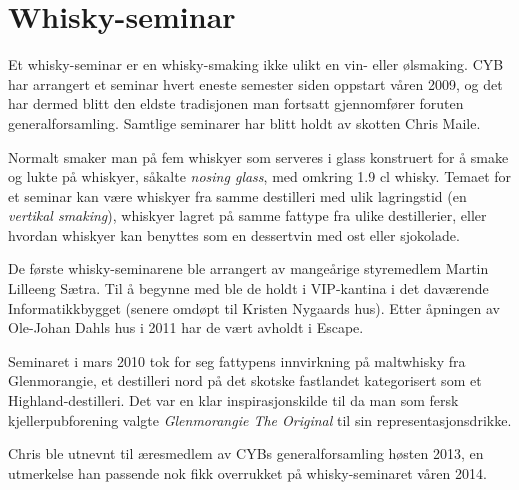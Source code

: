 \chapter{Whisky-seminar}

\author{Skrevet av Torgeir Lebesbye}

Et whisky-seminar er en whisky-smaking ikke ulikt en vin- eller ølsmaking. CYB har arrangert et seminar hvert eneste semester siden oppstart våren 2009, og det har dermed blitt den eldste tradisjonen man fortsatt gjennomfører foruten generalforsamling. Samtlige seminarer har blitt holdt av skotten Chris Maile.

Normalt smaker man på fem whiskyer som serveres i glass konstruert for å smake og lukte på whiskyer, såkalte \textit{nosing glass}, med omkring 1.9 cl whisky. Temaet for et seminar kan være whiskyer fra samme destilleri med ulik lagringstid (en \textit{vertikal smaking}), whiskyer lagret på samme fattype fra ulike destillerier, eller hvordan whiskyer kan benyttes som en dessertvin med ost eller sjokolade.

De første whisky-seminarene ble arrangert av mangeårige styremedlem Martin Lilleeng Sætra. Til å begynne med ble de holdt i VIP-kantina i det daværende Informatikkbygget (senere omdøpt til Kristen Nygaards hus). Etter åpningen av Ole-Johan Dahls hus i 2011 har de vært avholdt i Escape.

Seminaret i mars 2010 tok for seg fattypens innvirkning på maltwhisky fra Glenmorangie, et destilleri nord på det skotske fastlandet kategorisert som et Highland-destilleri. Det var en klar inspirasjonskilde til da man som fersk kjellerpubforening valgte \textit{Glenmorangie The Original} til sin representasjonsdrikke.

Chris ble utnevnt til æresmedlem av CYBs generalforsamling høsten 2013, en utmerkelse han passende nok fikk overrukket på whisky-seminaret våren 2014.